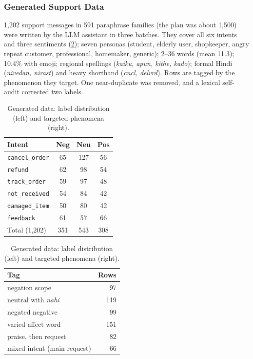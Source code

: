 \documentclass[11pt,a4paper]{article}
\theoremstyle{remark}
\newcommand{\lbl}[1]{\texttt{#1}}                      %
\newcommand{\hi}[1]{\textit{#1}}                       %
\begin{document}
\subsubsection{Generated Support Data}
1{,}202 support messages in 591 paraphrase families (the plan was about 1{,}500)
were written by the LLM assistant in three batches. They cover all six intents
and three sentiments (\cref{tab:v12gen}); seven personas (student, elderly user,
shopkeeper, angry repeat customer, professional, homemaker, generic); 2--36
words (mean 11.3); 10.4\% with emoji; regional spellings (\hi{kaiku, apun,
kithe, kado}); formal Hindi (\hi{nivedan, nirast}) and heavy shorthand
(\hi{cncl, delvrd}). Rows are tagged by the phenomenon they target. One
near-duplicate was removed, and a lexical self-audit corrected two labels.

\begin{table}[h]
\centering\small
\caption{Generated data: label distribution (left) and targeted phenomena (right).}
\label{tab:v12gen}
\begin{tabular}{@{}lccc@{}}
\toprule
Intent & Neg & Neu & Pos \\
\midrule
\lbl{cancel\_order}  & 65 & 127 & 56 \\
\lbl{refund}         & 62 & 98 & 54 \\
\lbl{track\_order}   & 59 & 97 & 48 \\
\lbl{not\_received}  & 54 & 84 & 42 \\
\lbl{damaged\_item}  & 50 & 80 & 42 \\
\lbl{feedback}       & 61 & 57 & 66 \\
\midrule
Total (1{,}202)      & 351 & 543 & 308 \\
\bottomrule
\end{tabular}
\hspace{1.2em}
\begin{tabular}{@{}lr@{}}
\toprule
Tag & Rows \\
\midrule
negation scope & 97 \\
neutral with \hi{nahi} & 119 \\
negated negative & 99 \\
varied affect word & 151 \\
praise, then request & 82 \\
mixed intent (main request) & 66 \\
\bottomrule
\end{tabular}
\end{table}
\end{document}
